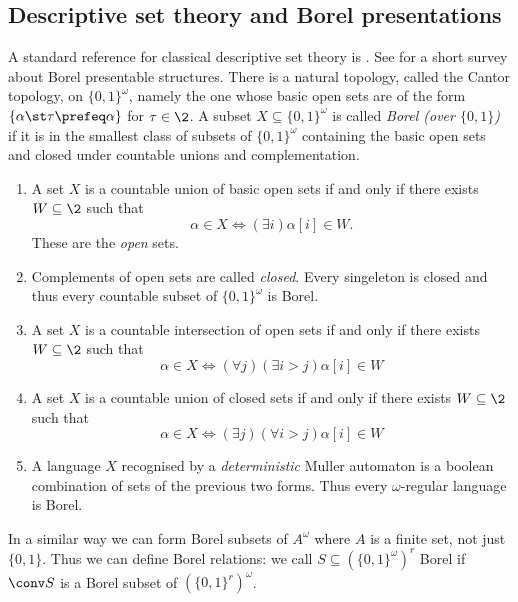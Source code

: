 \subsection{Descriptive set theory and Borel presentations}

A standard reference for classical descriptive set theory is \cite{Kech95}. See \cite{NiMo11} for a short survey about Borel presentable structures.
There is a natural topology, called the Cantor topology, on $\{0,1\}^\omega$, namely the one whose basic open
sets are of the form $\{\alpha \st \tau \prefeq \alpha\}$ for $\tau \in \2$.  A subset $X \subseteq \{0,1\}^\omega$ is called {\em Borel (over $\{0,1\}$)} if it is in the smallest
class of subsets of $\{0,1\}^\omega$ containing the basic open sets and closed under
countable unions and complementation. 

\begin{example}
\begin{enumerate}
 \item A set $X$ is a  countable union of basic open sets if and only if there exists $W \subseteq \2$ such that
\[
 \alpha \in X \iff (\exists i) \alpha[i] \in W.
\]
These are the {\em open} sets. 

\item Complements of open sets are called {\em closed}.  Every singeleton is closed and thus
every countable subset of $\{0,1\}^\omega$ is Borel.

\item A set $X$ is a countable intersection of open sets if and only if there exists $W \subseteq \2$ such that
\[
\alpha \in X \iff (\forall j) (\exists i > j)\alpha[i] \in W
\]

\item A set $X$ is a countable union of closed sets if and only if there exists $W \subseteq \2$ such that
\[
\alpha \in X \iff (\exists j) (\forall i > j) \alpha[i] \in W
\]
 
\item A language $X$ recognised by a {\em deterministic} Muller automaton is a boolean combination of sets of the previous two forms. Thus 
every $\omega$-regular language is Borel.
\end{enumerate}
\end{example}

In a similar way we can form Borel subsets of $A^\omega$ where $A$ is a finite set, not just $\{0,1\}$.
Thus we can define Borel relations: we call $S \subseteq (\{0,1\}^\omega)^r$ Borel if $\conv S$ is a Borel subset of $(\{0,1\}^r)^\omega$.

